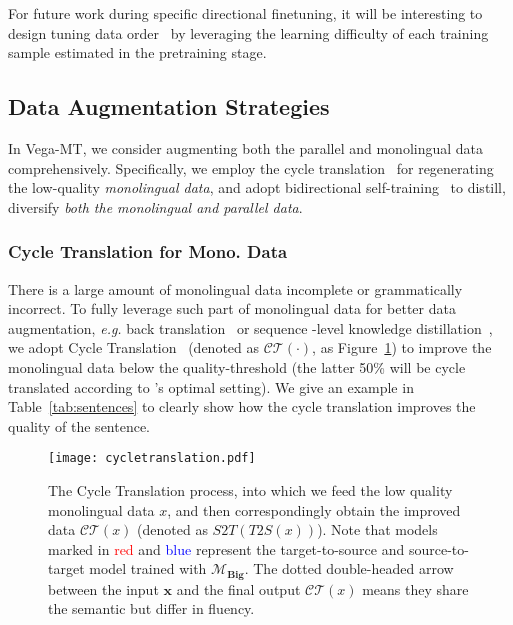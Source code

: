 \documentclass[11pt,a4paper]{article}
\newcommand{\zct}{\color{black}}
\begin{document}
For future work during specific directional finetuning, it will be interesting to design tuning data order~\cite{liu-etal-2020-norm,zhou-etal-2021-self} by leveraging the learning difficulty of each training sample estimated in the pretraining stage.

\subsection{Data Augmentation Strategies}
\label{ssec:DA}
In Vega-MT, we consider augmenting both the parallel and monolingual data comprehensively. Specifically, we employ the cycle translation~\cite{ding2019usyd} for regenerating the low-quality \textit{monolingual data}, and adopt bidirectional self-training~\cite{ding2021usyd} to distill, diversify \textit{both the monolingual and parallel data}.

\subsubsection{Cycle Translation for Mono. Data}
\label{ssec:ct}
There is a large amount of monolingual data incomplete or grammatically incorrect. To fully leverage such part of monolingual data for better data augmentation, \textit{e.g.} back translation~\cite{sennrich-etal-2016-improving} or {\zct sequence -level} knowledge distillation~\cite{kim-rush-2016-sequence}, we adopt Cycle Translation~\cite{ding2019usyd} (denoted as $\mathcal{C}\mathcal{T}(\cdot)$, as Figure~\ref{fig:cycle-translation}) to improve the monolingual data below the quality-threshold (the latter 50\% will be cycle translated according to \citet{ding2019usyd}'s optimal setting). We give an example in Table~\ref{tab:sentences} to clearly show how the cycle translation improves the quality of the sentence.

\begin{figure}[t!]
    \centering
    \texttt{[image: cycletranslation.pdf]}
    \caption{The Cycle Translation process, into which we feed the low quality monolingual data $x$, and then correspondingly obtain the improved data $\mathcal{C}\mathcal{T}(x)$ (denoted as $S2T(T2S(x))$). Note that models marked in \textcolor{red}{red} and \textcolor{blue}{blue} represent the target-to-source and source-to-target model trained with $\mathcal{M}_\textbf{Big}$. The dotted double-headed arrow between the input $\mathbf{x}$ and the final output $\mathcal{C}\mathcal{T}(x)$ means they share the semantic but differ in fluency.}
    \label{fig:cycle-translation}
\end{figure}
\end{document}
